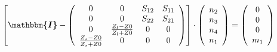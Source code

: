 \[ \left[ \boldsymbol{\mathbbm{I}}  - \left(\begin{array}{cccc} 0 & 0
& S_{12} & S_{11} \\ 0 & 0 & S_{22} & S_{21} \\ 0 & \frac{ Z_l -Z0}{
Z_l +Z0} & 0 & 0 \\ \frac{ Z_s -Z0}{ Z_s +Z0} & 0 & 0 & 0
\end{array}\right)\right] \cdot \left(\begin{array}{c} n_{2} \\ n_{3}
\\ n_{4} \\ n_{1} \end{array}\right) = \left(\begin{array}{c} 0 \\ 0
\\ 0 \\ m_{1} \end{array}\right) \]
